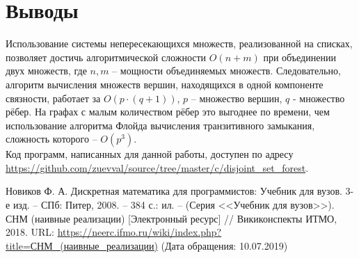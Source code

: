\documentclass[a4paper,12pt]{article} %
\begin{document}
\section{Выводы}
Использование системы непересекающихся множеств, реализованной на списках, позволяет достичь алгоритмической сложности $O(n + m)$ при объединении двух множеств, где $n, m$ -- мощности объединяемых множеств. Следовательно, алгоритм вычисления множеств вершин, находящихся в одной компоненте связности, работает за $O(p \cdot (q + 1))$, $p$ -- множество вершин, $q$ - множество рёбер. На графах с малым количеством рёбер это выгоднее по времени, чем использование алгоритма Флойда вычисления транзитивного замыкания, сложность которого -- $O(p^3)$.\\
Код программ, написанных для данной работы, доступен по адресу \url{https://github.com/zuevval/source/tree/master/c/disjoint_set_forest}.

%
\begin{thebibliography}{100}
	 Новиков Ф. А. Дискретная математика для программистов: Учебник для вузов. 3-е изд. -- СПб: Питер, 2008. -- 384 с.: ил. -- (Серия <<Учебник для вузов>>).
	 СНМ (наивные реализации) [Электронный ресурс] // Викиконспекты ИТМО, 2018. URL: \href{https://neerc.ifmo.ru/wiki/index.php?title=\%D0\%A1\%D0\%9D\%D0\%9C_(\%D0\%BD\%D0\%B0\%D0\%B8\%D0\%B2\%D0\%BD\%D1\%8B\%D0\%B5_\%D1\%80\%D0\%B5\%D0\%B0\%D0\%BB\%D0\%B8\%D0\%B7\%D0\%B0\%D1\%86\%D0\%B8\%D0\%B8)}{https://neerc.ifmo.ru/wiki/index.php?title=СНМ\_(наивные\_реализации)}  (Дата обращения: 10.07.2019)
\end{thebibliography}
\end{document}
